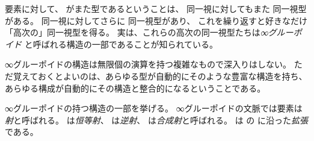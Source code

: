 \documentclass[index]{subfiles}
\begin{document}

要素に対して、
がまた型であるということは、
同一視に対してもまた
同一視型がある。
同一視に対してさらに
同一視型があり、
これを繰り返すと好きなだけ「高次の」同一視型を得る。
実は、これらの高次の同一視型たちは\emph{∞グルーポイド}
と呼ばれる構造の一部であることが知られている。

∞グルーポイドの構造は無限個の演算を持つ複雑なもので深入りはしない。
ただ覚えておくとよいのは、あらゆる型が自動的にそのような豊富な構造を持ち、
あらゆる構成が自動的にその構造と整合的になるということである。

∞グルーポイドの持つ構造の一部を挙げる。
∞グルーポイドの文脈では要素は
\emph{射}と呼ばれる。
は\emph{恒等射}、
は\emph{逆射}、
は\emph{合成射}と呼ばれる。
は
の
に沿った\emph{拡張}である。






\end{document}
